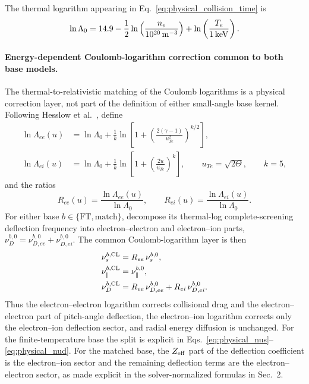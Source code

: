 \documentclass[11pt]{article}
\begin{document}
The thermal logarithm appearing in Eq.~\eqref{eq:physical_collision_time} is
\begin{equation}
 \ln\Lambda_0
 =14.9-\frac12\ln\left(\frac{n_e}{10^{20}\,{\rm m}^{-3}}\right)
 +\ln\left(\frac{T_e}{1\,{\rm keV}}\right).
 \label{eq:physical_thermal_log}
\end{equation}

\paragraph{Energy-dependent Coulomb-logarithm correction common to both base models.}
The thermal-to-relativistic matching of the Coulomb logarithms is a physical correction
layer, not part of the definition of either small-angle base kernel.  Following Hesslow
et al.~\cite{Hesslow2019Dreicer}, define
\begin{align}
 \ln\Lambda_{ee}(u)
 &=\ln\Lambda_0+\frac{1}{k}
 \ln\left[
  1+\left(\frac{2(\gamma-1)}{u_{Te}^2}\right)^{k/2}
 \right],\\
 \ln\Lambda_{ei}(u)
 &=\ln\Lambda_0+\frac{1}{k}
 \ln\left[1+\left(\frac{2u}{u_{Te}}\right)^k\right],
 \qquad
 u_{Te}=\sqrt{2\Theta},
 \qquad k=5,
 \label{eq:physical_matched_logs}
\end{align}
and the ratios
\begin{equation}
 R_{ee}(u)=\frac{\ln\Lambda_{ee}(u)}{\ln\Lambda_0},
 \qquad
 R_{ei}(u)=\frac{\ln\Lambda_{ei}(u)}{\ln\Lambda_0}.
 \label{eq:physical_log_ratios}
\end{equation}
For either base $b\in\{\mathrm{FT},\mathrm{match}\}$, decompose its thermal-log
complete-screening deflection frequency into electron--electron and electron--ion parts,
$\nu_D^{b,0}=\nu_{D,ee}^{b,0}+\nu_{D,ei}^{b,0}$.  The common Coulomb-logarithm layer is
then
\begin{align}
 \nu_s^{b,\rm CL}&=R_{ee}\,\nu_s^{b,0},\\
 \nu_\parallel^{b,\rm CL}&=\nu_\parallel^{b,0},\\
 \nu_D^{b,\rm CL}
 &=R_{ee}\,\nu_{D,ee}^{b,0}
  +R_{ei}\,\nu_{D,ei}^{b,0}.
 \label{eq:physical_common_log_overlay}
\end{align}
Thus the electron--electron logarithm corrects collisional drag and the
 electron--electron part of pitch-angle deflection, the electron--ion logarithm corrects
only the electron--ion deflection sector, and radial energy diffusion is unchanged.
For the finite-temperature base the split is explicit in
Eqs.~\eqref{eq:physical_nus}--\eqref{eq:physical_nud}.  For the matched base, the
$Z_{\rm eff}$ part of the deflection coefficient is the electron--ion sector and the
remaining deflection terms are the electron--electron sector, as made explicit in the
solver-normalized formulas in Sec.~2.
\end{document}
